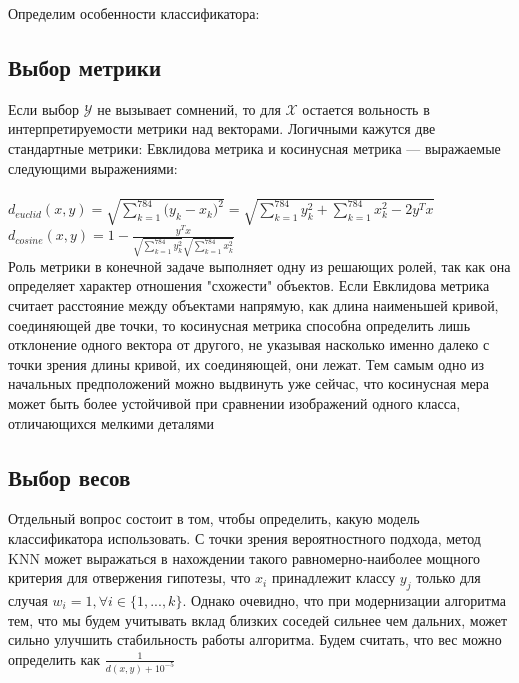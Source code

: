 \documentclass{article}
\begin{document}
    \noindent Определим особенности классификатора:

    \subsection{Выбор метрики}
        Если выбор $\mathcal{Y}$ не вызывает сомнений, то для $\mathcal{X}$ остается вольность в интерпретируемости метрики над векторами. Логичными кажутся две стандартные метрики: Евклидова метрика и косинусная метрика — выражаемые следующими выражениями: \\ \\ 
        $d_{euclid}(x, y)=\sqrt{\sum_{k=1}^{784}{(y_k - x_k})^2} = \sqrt{\sum_{k=1}^{784}y_k^2 +\sum_{k=1}^{784}x_k^2 - 2y^Tx}$ \\
        $d_{cosine}(x, y)=1 - \frac{y^Tx}{\sqrt{\sum_{k=1}^{784}{y_k^2}}{\sqrt{\sum_{k=1}^{784}{x_k^2}}}}$\\

        \noindent Роль метрики в конечной задаче выполняет одну из решающих ролей, так как она определяет характер отношения "схожести" объектов. Если Евклидова метрика считает расстояние между объектами напрямую, как длина наименьшей кривой, соединяющей две точки, то косинусная метрика способна определить лишь отклонение одного вектора от другого, не указывая насколько именно далеко с точки зрения длины кривой, их соединяющей, они лежат. Тем самым одно из начальных предположений можно выдвинуть уже сейчас, что косинусная мера может быть более устойчивой при сравнении изображений одного класса, отличающихся мелкими деталями

    \subsection{Выбор весов}
        Отдельный вопрос состоит в том, чтобы определить, какую модель классификатора использовать. С точки зрения вероятностного подхода, метод KNN может выражаться в нахождении такого равномерно-наиболее мощного критерия для отвержения гипотезы, что $x_i$ принадлежит классу $y_j$ только для случая $w_i = 1, \forall i \in \{1, ..., k\}$. Однако очевидно, что при модернизации алгоритма тем, что мы будем учитывать вклад близких соседей сильнее чем дальних, может сильно улучшить стабильность работы алгоритма. Будем считать, что вес можно определить как $\frac{1}{d(x, y) + 10^{-5}}$
\end{document}
